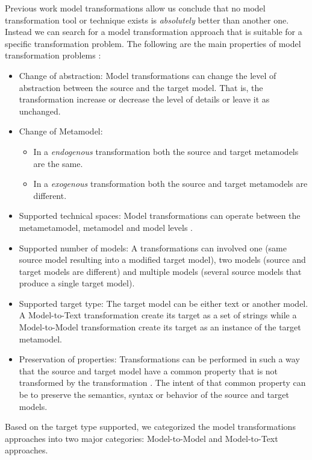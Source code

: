 Previous work \cite{Czarnecki2006, biehl2010literature} model transformations allow us conclude that no model transformation tool or technique exists is \textit{absolutely} better than another one. Instead we can search for a model transformation approach that is suitable for a specific transformation problem. The following are the main properties of model transformation problems \cite{biehl2010literature}:

\begin{itemize}
\item Change of abstraction: Model transformations can change the level of abstraction between the source and the target model. That is, the transformation increase or decrease the level of details or leave it as unchanged.
\item Change of Metamodel: 
	\begin{itemize}
		\item In a \textit{endogenous} \cite{Visser2005} transformation both the source and target metamodels are 			the same.
		\item In a \textit{exogenous} \cite{Visser2005} transformation both the source and target metamodels are 			different.
	\end{itemize}
\item Supported technical spaces: Model transformations can operate between the metametamodel, metamodel and model levels \cite{OOPSLA2004Bezivin}. 
\item Supported number of models: A transformations can involved one (same source model resulting into a modified target model), two models (source and target models are different) and multiple models (several source models that produce a single target model).
\item Supported target type: The target model can be either text or another model. A Model-to-Text transformation create its target as a set of strings while a  Model-to-Model transformation create its target as an instance of the target metamodel.
\item Preservation of properties: Transformations can be performed in such a way that the source and target model have a common property that is not transformed by the transformation \cite{biehl2010literature}. The intent of that common property can be to preserve the semantics, syntax or behavior of the source and target models. 
\end{itemize}

Based on the target type supported, we categorized the model transformations approaches into two major categories\cite{Czarnecki2006}: Model-to-Model and Model-to-Text approaches. 

